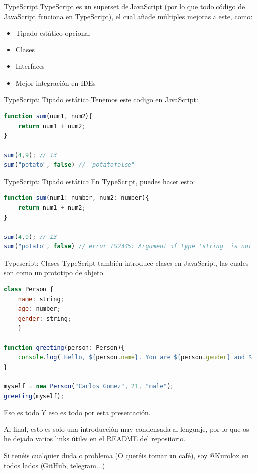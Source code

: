 \documentclass{beamer}
\begin{document}
\begin{frame}{TypeScript}
TypeScript es un superset de JavaScript (por lo que todo código de JavaScript funciona en TypeScript), el cual añade múltiples mejoras a este, como:
\begin{itemize}
    \item Tipado estático opcional
    \item Clases
    \item Interfaces
    \item Mejor integración en IDEs
\end{itemize}
\end{frame}

\begin{frame}[fragile]{TypeScript: Tipado estático}
Tenemos este codigo en JavaScript:
\begin{lstlisting}[language=JavaScript]
function sum(num1, num2){
    return num1 + num2;
}

sum(4,9); // 13
sum("potato", false) // "potatofalse"
\end{lstlisting}
\end{frame}

\begin{frame}[fragile]{TypeScript: Tipado estático}
En TypeScript, puedes hacer esto:
\begin{lstlisting}[language=JavaScript]
function sum(num1: number, num2: number){
    return num1 + num2;
}

sum(4,9); // 13
sum("potato", false) // error TS2345: Argument of type 'string' is not assignable to parameter of type 'number'.
\end{lstlisting}
\end{frame}

\begin{frame}[fragile]{Typescript: Clases}
TypeScript también introduce clases en JavaScript, las cuales son como un prototipo de objeto.

\begin{lstlisting}[language=JavaScript]
class Person {
    name: string;
    age: number;
    gender: string;
    }

function greeting(person: Person){
    console.log(`Hello, ${person.name}. You are ${person.gender} and ${person.age} years old.`);
}

myself = new Person("Carlos Gomez", 21, "male");
greeting(myself);
\end{lstlisting}
\end{frame}

\begin{frame}{Eso es todo}
Y eso es todo por esta presentación. 

Al final, esto es solo una introducción muy condensada al lenguaje, por lo que os he dejado varios links útiles en el README del repositorio.

Si tenéis cualquier duda o problema (O queréis tomar un café), soy @Kurolox en todos lados (GitHub, telegram...)
\end{frame}
\end{document}
